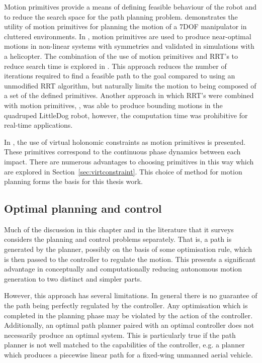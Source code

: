 Motion primitives provide a means of defining feasible behaviour of the robot and to reduce the search space for the path planning problem. \cite{cohen2011planning} demonstrates the utility of motion primitives for planning the motion of a 7DOF manipulator in cluttered environments. In \cite{frazzoli2005maneuver}, motion primitives are used to produce near-optimal motions in non-linear systems with symmetries and validated in simulations with a helicopter. The combination of the use of motion primitives and RRT's to reduce search time is explored in \cite{vonasek2013global}. This approach reduces the number of iterations required to find a feasible path to the goal compared to using an unmodified RRT algorithm, but naturally limits the motion to being composed of a set of the defined primitives. Another approach in which RRT's were combined with motion primitives, \cite{shkolnik2011bounding}, was able to produce bounding motions in the quadruped LittleDog robot, however, the computation time was prohibitive for real-time applications. 

In \cite{manchester13planning}, the use of virtual holonomic constraints as motion primitives is presented. These primitives correspond to the continuous phase dynamics between each impact. There are numerous advantages to choosing primitives in this way which are explored in Section~\ref{sec:virtconstraint}. This choice of method for motion planning forms the basis for this thesis work.

\subsection{Optimal planning and control}
Much of the discussion in this chapter and in the literature that it surveys considers the planning and control problems separately. That is, a path is generated by the planner, possibly on the basis of some optimisation rule, which is then passed to the controller to regulate the motion. This presents a significant advantage in conceptually and computationally reducing autonomous motion generation to two distinct and simpler parts.

However, this approach has several limitations. In general there is no guarantee of the path being perfectly regulated by the controller. Any optimisation which is completed in the planning phase may be violated by the action of the controller. Additionally, an optimal path planner paired with an optimal controller does not necessarily produce an optimal system. This is particularly true if the path planner is not well matched to the capabilities of the controller, e.g. a planner which produces a piecewise linear path for a fixed-wing unmanned aerial vehicle.

